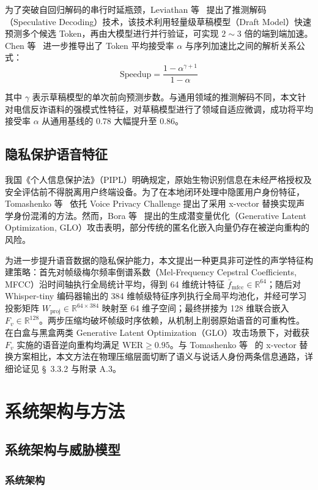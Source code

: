\documentclass[11pt, a4paper]{article}
\begin{document}
为了突破自回归解码的串行时延瓶颈，Leviathan 等~\cite{20} 提出了推测解码（Speculative Decoding）技术，该技术利用轻量级草稿模型（Draft Model）快速预测多个候选 Token，再由大模型进行并行验证，可实现 $2\sim3$ 倍的端到端加速。Chen 等~\cite{21} 进一步推导出了 Token 平均接受率 $\alpha$ 与序列加速比之间的解析关系公式：
\begin{equation}
    \text{Speedup} = \frac{1-\alpha^{\gamma+1}}{1-\alpha}
\end{equation}

其中 $\gamma$ 表示草稿模型的单次前向预测步数。与通用领域的推测解码不同，本文针对电信反诈语料的强模式性特征，对草稿模型进行了领域自适应微调，成功将平均接受率 $\alpha$ 从通用基线的 $0.78$ 大幅提升至 $0.86$。

\subsection{隐私保护语音特征}
我国《个人信息保护法》（PIPL）明确规定，原始生物识别信息在未经严格授权及安全评估前不得脱离用户终端设备。为了在本地闭环处理中隐匿用户身份特征，Tomashenko 等~\cite{22} 依托 Voice Privacy Challenge 提出了采用 x-vector 替换实现声学身份混淆的方法。然而，Bora 等~\cite{23} 提出的生成潜变量优化（Generative Latent Optimization, GLO）攻击表明，部分传统的匿名化嵌入向量仍存在被逆向重构的风险。

为进一步提升语音数据的隐私保护能力，本文提出一种更具非可逆性的声学特征构建策略：首先对帧级梅尔频率倒谱系数（Mel-Frequency Cepstral Coefficients, MFCC）沿时间轴执行全局统计平均，得到 64 维统计特征 $\bar{f}_{\text{mfcc}}\in\mathbb{R}^{64}$；随后对 Whisper-tiny 编码器输出的 384 维帧级特征序列执行全局平均池化，并经可学习投影矩阵 $W_{\text{proj}}\in\mathbb{R}^{64\times384}$ 映射至 64 维子空间；最终拼接为 128 维联合嵌入 $F_v\in\mathbb{R}^{128}$。两步压缩均破坏帧级时序依赖，从机制上削弱原始语音的可重构性。在白盒与黑盒两类 Generative Latent Optimization（GLO）攻击场景下，对截获 $F_v$ 实施的语音逆向重构均满足 $\text{WER}\ge 0.95$。与 Tomashenko 等~\cite{22,23} 的 x-vector 替换方案相比，本文方法在物理压缩层面切断了语义与说话人身份两条信息通路，详细论证见 \S~3.3.2 与附录 A.3。    

\section{系统架构与方法}
\subsection{系统架构与威胁模型}
\subsubsection{系统架构}
\end{document}
